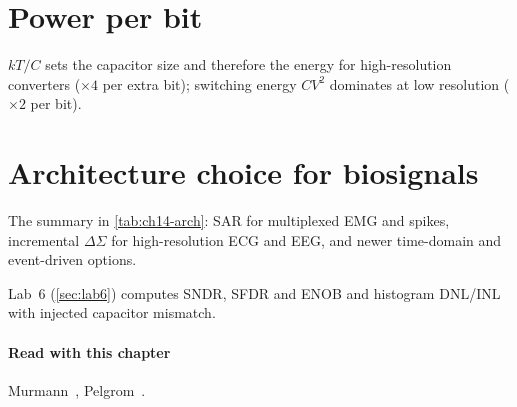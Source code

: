 \section{Power per bit}\label{sec:ch14-3}
$kT/C$ sets the capacitor size and therefore the energy for high-resolution converters ($\times 4$ per extra bit); switching energy $CV^2$ dominates at low resolution ($\times 2$ per bit).

\section{Architecture choice for biosignals}\label{sec:ch14-4}
The summary in \cref{tab:ch14-arch}: SAR for multiplexed EMG and spikes, incremental $\Delta\Sigma$ for high-resolution ECG and EEG, and newer time-domain and event-driven options.

\begin{tryit}
Lab~6 (\cref{sec:lab6}) computes SNDR, SFDR and ENOB and histogram DNL/INL with injected capacitor mismatch.
\end{tryit}

\paragraph{Read with this chapter} Murmann~\cite{murmannsurvey}, Pelgrom~\cite{pelgrom}.
